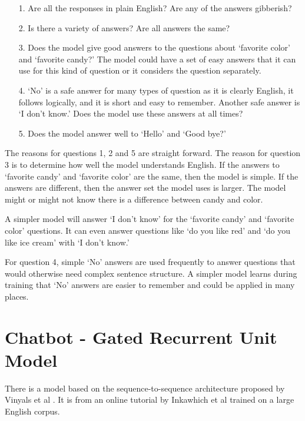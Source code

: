 \begin{itemize}
	
	\item [1.] Are all the responses in plain English? Are any of the answers gibberish?
	
	\item [2.] Is there a  variety of answers? Are all answers the same?
	
	\item [3.] Does the model give good answers to the questions about `favorite color' and `favorite candy?' The model could have a set of easy answers that it can use for this kind of question or it considers the question separately. 
	
	\item [4.] `No' is a safe answer for many types of question as it is clearly English, it follows logically, and it is short and easy to remember. Another safe answer is `I don't know.' Does the model use these answers at all times?
	
	\item [5.] Does the model answer well to `Hello' and `Good bye?'
	
\end{itemize}

The reasons for questions 1, 2 and 5 are straight forward. The reason for question 3 is to determine how well the model understands English. If the answers to `favorite candy' and `favorite color' are the same, then the model is simple. If the answers are different, then the answer set the model uses is larger. The model might or might not know there is a difference between candy and color. 

A simpler model will answer `I don't know' for the `favorite candy' and `favorite color' questions. It can even answer questions like `do you like red' and `do you like ice cream' with `I don't know.' 

For question 4, simple `No' answers are used frequently to answer questions that would otherwise need complex sentence structure. A simpler model learns during training that `No' answers are easier to remember and could be applied in many places.

\section{Chatbot - Gated Recurrent Unit Model}
There is a model based on the sequence-to-sequence architecture proposed by Vinyals et al \cite{DBLP:journals/corr/VinyalsL15}.
It is from an online tutorial by  Inkawhich et al \cite{2018Inkawhich} trained on a large English corpus. 

